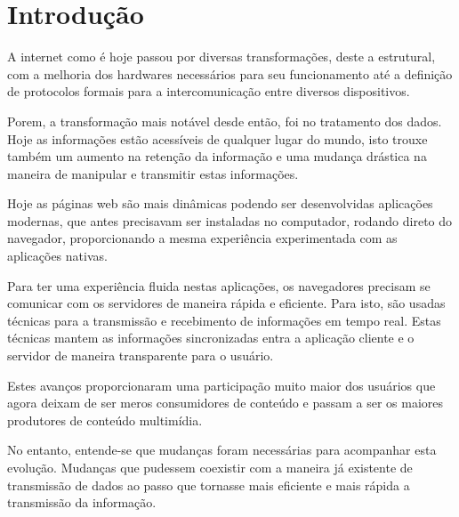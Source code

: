 \section{Introdução}


A internet como é hoje passou por diversas transformações, deste a estrutural, com a melhoria dos hardwares necessários para seu funcionamento até a definição de protocolos formais para a intercomunicação entre diversos dispositivos.

Porem, a transformação mais notável desde então, foi no tratamento dos dados. Hoje as informações estão acessíveis de qualquer lugar do mundo, isto trouxe também um aumento na retenção da informação e uma mudança drástica na maneira de manipular e transmitir estas informações.

Hoje as páginas web são mais dinâmicas podendo ser desenvolvidas aplicações modernas, que antes precisavam ser instaladas no computador, rodando direto do navegador,  proporcionando a mesma experiência experimentada com as aplicações nativas.

Para ter uma experiência fluida nestas aplicações, os navegadores precisam se comunicar com os servidores de maneira rápida e eficiente. Para isto, são usadas técnicas para a transmissão e recebimento de informações em tempo real. Estas técnicas mantem as informações sincronizadas entra a aplicação cliente e o servidor de maneira transparente para o usuário.

Estes avanços proporcionaram uma participação muito maior dos usuários que agora deixam de ser meros consumidores de conteúdo e passam a ser os maiores produtores de conteúdo multimídia.

No entanto, entende-se que mudanças foram necessárias para acompanhar esta evolução. Mudanças que pudessem coexistir com a maneira já existente de transmissão de dados ao passo que tornasse mais eficiente e mais rápida a transmissão da informação.

